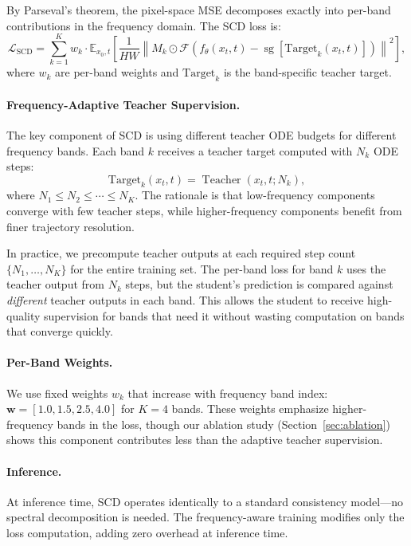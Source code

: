 \documentclass{article}
\newcommand{\scd}{\textsc{SCD}}
\newcommand{\E}{\mathbb{E}}
\newcommand{\Loss}{\mathcal{L}}
\begin{document}
By Parseval's theorem, the pixel-space MSE decomposes exactly into per-band contributions in the frequency domain. The \scd{} loss is:
\begin{equation}
    \Loss_{\text{SCD}} = \sum_{k=1}^{K} w_k \cdot \E_{x_0, t}\left[\frac{1}{HW}\left\|M_k \odot \mathcal{F}\left(f_\theta(x_t, t) - \operatorname{sg}\left[\text{Target}_k(x_t, t)\right]\right)\right\|^2\right],
    \label{eq:scd}
\end{equation}
where $w_k$ are per-band weights and $\text{Target}_k$ is the band-specific teacher target.

\paragraph{Frequency-Adaptive Teacher Supervision.}
The key component of \scd{} is using different teacher ODE budgets for different frequency bands. Each band $k$ receives a teacher target computed with $N_k$ ODE steps:
\begin{equation}
    \text{Target}_k(x_t, t) = \operatorname{Teacher}(x_t, t; N_k),
\end{equation}
where $N_1 \leq N_2 \leq \cdots \leq N_K$. The rationale is that low-frequency components converge with few teacher steps, while higher-frequency components benefit from finer trajectory resolution.

In practice, we precompute teacher outputs at each required step count $\{N_1, \ldots, N_K\}$ for the entire training set. The per-band loss for band $k$ uses the teacher output from $N_k$ steps, but the student's prediction is compared against \emph{different} teacher outputs in each band. This allows the student to receive high-quality supervision for bands that need it without wasting computation on bands that converge quickly.

\paragraph{Per-Band Weights.}
We use fixed weights $w_k$ that increase with frequency band index: $\mathbf{w} = [1.0, 1.5, 2.5, 4.0]$ for $K=4$ bands. These weights emphasize higher-frequency bands in the loss, though our ablation study (Section~\ref{sec:ablation}) shows this component contributes less than the adaptive teacher supervision.

\paragraph{Inference.}
At inference time, \scd{} operates identically to a standard consistency model---no spectral decomposition is needed. The frequency-aware training modifies only the loss computation, adding zero overhead at inference time.
\end{document}
